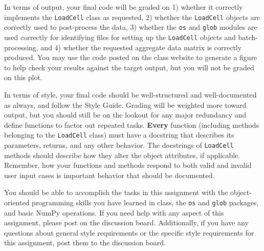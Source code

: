 \documentclass{homework}
\begin{document}
In terms of output, your final code will be graded on 1) whether it correctly implements the \texttt{LoadCell} class as requested, 2) whether the \texttt{LoadCell} objects are correctly used to post-process the data, 3) whether the \texttt{os} and \texttt{glob} modules are used correctly for identifying files for setting up the \texttt{LoadCell} objects and batch-processing, and 4) whether the requested aggregate data matrix is correctly produced. You may use the code posted on the class website to generate a figure to help check your results against the target output, but you will not be graded on this plot.

In terms of style, your final code should be well-structured and well-documented as always, and follow the Style Guide. Grading will be weighted more toward output, but you should still be on the lookout for any major redundancy and define functions to factor out repeated tasks. \textbf{Every} function (including methods belonging to the \texttt{LoadCell} class) must have a docstring that describes its parameters, returns, and any other behavior. The docstrings of \texttt{LoadCell} methods should describe how they alter the object attributes, if applicable. Remember, how your functions and methods respond to both valid and invalid user input cases is important behavior that should be documented.

You should be able to accomplish the tasks in this assignment with the object-oriented programming skills you have learned in class, the \texttt{os} and \texttt{glob} packages, and basic NumPy operations. If you need help with any aspect of this assignment, please post on the discussion board. Additionally, if you have any questions about general style requirements or the specific style requirements for this assignment, post them to the discussion board.
\end{document}
